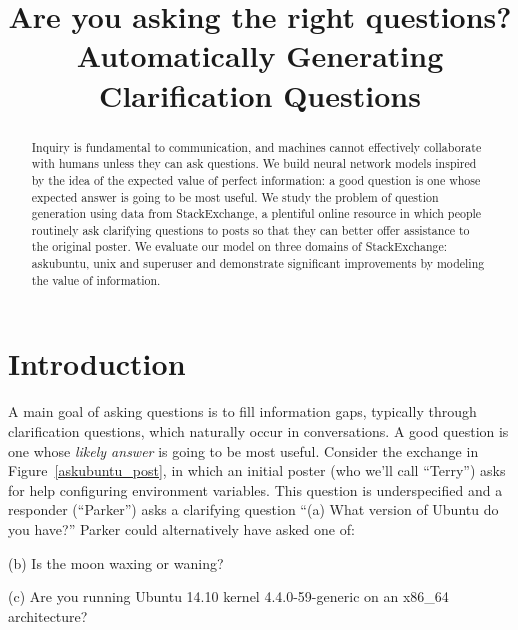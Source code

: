 \documentclass[11pt,a4paper]{article}
\title{Are you asking the right questions? \\ Automatically Generating Clarification Questions}
\date{}
\begin{document}
\maketitle
\begin{abstract}
Inquiry is fundamental to communication, and machines cannot effectively collaborate with humans unless they can ask questions. We build neural network models inspired by the idea of the expected value of perfect information: a good question is one whose expected answer is going to be most useful. We study the problem of question generation using data from StackExchange, a plentiful online resource in which people routinely ask clarifying questions to posts so that they can better offer assistance to the original poster. We evaluate our model on three domains of StackExchange: askubuntu, unix and superuser and demonstrate significant improvements by modeling the value of information.
\end{abstract}

\section{Introduction}\label{introduction}

A main goal of asking questions is to fill information gaps, typically through clarification questions, which naturally occur in conversations. 
A good question is one whose \emph{likely answer} is going to be most useful.
Consider the exchange in Figure~\ref{askubuntu_post}, in which an initial poster (who we'll call ``Terry'') asks for help configuring environment variables.
This question is underspecified and a responder (``Parker'') asks a clarifying question ``\textsf{\small (a) What version of Ubuntu do you have?}''
Parker could alternatively have asked one of:

\textsf{\small(b) Is the moon waxing or waning?}

\textsf{\small(c) Are you running Ubuntu 14.10 kernel 4.4.0-59-generic on an x86\_64 architecture?}
\end{document}

